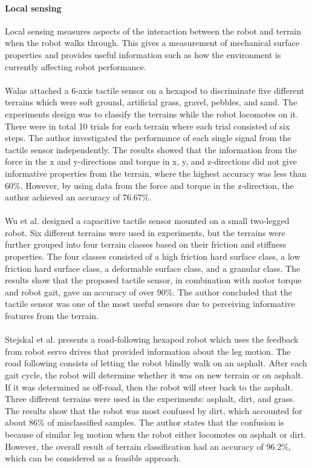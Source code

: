 \documentclass[USenglish]{ifimaster}  %
\begin{document}
\paragraph{Local sensing}
Local sensing measures aspects of the interaction between the robot and terrain when the robot walks through. This gives a measurement of mechanical surface properties and provides useful information such as how the environment is currently affecting robot performance. 
\\
\\
Walas \cite{walastactile} attached a 6-axis tactile sensor on a hexapod to discriminate five different terrains which were soft ground, artificial grass, gravel, pebbles, and sand. The experiments design was to classify the terrains while the robot locomotes on it. There were in total 10 trials for each terrain where each trial consisted of six steps. The author investigated the performance of each single signal from the tactile sensor independently. The results showed that the information from the force in the x and y-directions and torque in x, y, and z-directions did not give informative properties from the terrain, where the highest accuracy was less than 60\%. However, by using data from the force and torque in the z-direction, the author achieved an accuracy of 76.67\%.
\\
\\
Wu et al. \cite{7397881} designed a capacitive tactile sensor mounted on a small two-legged robot. Six different terrains were used in experiments, but the terrains were further grouped into four terrain classes based on their friction and stiffness properties. The four classes consisted of a high friction hard surface class,  a low friction hard surface class, a deformable surface class, and a granular class.  The results show that the proposed tactile sensor, in combination with motor torque and robot gait, gave an accuracy of over 90\%. The author concluded that the tactile sensor was one of the most useful sensors due to perceiving informative features from the terrain.
\\
\\ 
Stejskal et al. \cite{7487544} presents a road-following hexapod robot which uses the feedback from robot servo drives that provided information about the leg motion. The road following consists of letting the robot blindly walk on an asphalt. After each gait cycle, the robot will determine whether it was on new terrain or on asphalt. If it was determined as off-road, then the robot will steer back to the asphalt.  Three different terrains were used in the experiments: asphalt, dirt, and grass.  The results show that the robot was most confused by dirt, which accounted for about 86\% of misclassified samples. The author states that the confusion is because of similar leg motion when the robot either locomotes on asphalt or dirt.  However, the overall result of terrain classification had an accuracy of 96.2\%, which can be considered as a feasible approach.
\end{document}
